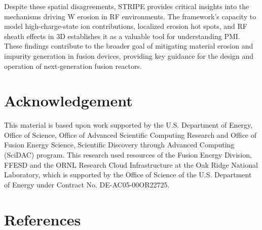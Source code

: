 \documentclass[10pt]{iopart}
\begin{document}
Despite these spatial disagreements, STRIPE provides critical insights into the mechanisms driving W erosion in RF environments. The framework’s capacity to model high-charge-state ion contributions, localized erosion hot spots, and RF sheath effects in 3D establishes it as a valuable tool for understanding PMI. These findings contribute to the broader goal of mitigating material erosion and impurity generation in fusion devices, providing key guidance for the design and operation of next-generation fusion reactors.

\section*{Acknowledgement}
 This material is based upon work supported by the U.S. Department of Energy, Office of Science, Office of Advanced Scientific Computing Research and Office of Fusion Energy Science, Scientific Discovery through Advanced Computing (SciDAC) program. This research used resources of the Fusion Energy Division, FFESD and the ORNL Research Cloud Infrastructure at the Oak Ridge National Laboratory, which is supported by the Office of Science of the U.S. Department of Energy under Contract No. DE-AC05-00OR22725.
\section*{References}
  

\end{document}
